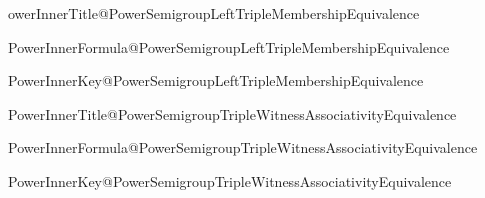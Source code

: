 \expandafter\newcommand\csname PowerInnerTitle@PowerSemigroupLeftTripleMembershipEquivalence

\expandafter\newcommand\csname PowerInnerFormula@PowerSemigroupLeftTripleMembershipEquivalence

\expandafter\newcommand\csname PowerInnerKey@PowerSemigroupLeftTripleMembershipEquivalence

\expandafter\newcommand\csname PowerInnerTitle@PowerSemigroupTripleWitnessAssociativityEquivalence

\expandafter\newcommand\csname PowerInnerFormula@PowerSemigroupTripleWitnessAssociativityEquivalence

\expandafter\newcommand\csname PowerInnerKey@PowerSemigroupTripleWitnessAssociativityEquivalence

